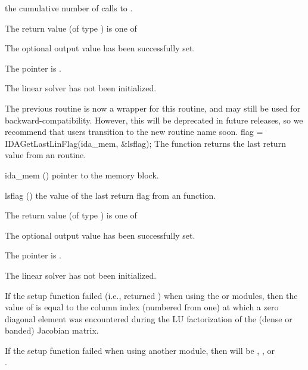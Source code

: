 {{\begin{args}[njvevals]
    the cumulative number of calls to .
  \end{args}
}
{
  The return value  (of type ) is one of
  \begin{args}
  \item[\Id{IDALS\_SUCCESS}]
    The optional output value has been successfully set.
  \item[\Id{IDALS\_MEM\_NULL}]
    The  pointer is .
  \item[\Id{IDALS\_LMEM\_NULL}]
    The {\idals} linear solver has not been initialized.
  \end{args}
}
{
  The previous routine  is now a wrapper for
  this routine, and may still be used for backward-compatibility.
  However, this will be deprecated in future releases, so we recommend
  that users transition to the new routine name soon.
}
{
  flag = IDAGetLastLinFlag(ida\_mem, \&lsflag);
}
{
  The function  returns the
  last return value from an {\idals} routine.
}
{
  \begin{args}
  \item[ida\_mem] ()
    pointer to the {\ida} memory block.
  \item[lsflag] ()
    the value of the last return flag from an {\idals} function.
  \end{args}
}
{
  The return value  (of type ) is one of
  \begin{args}
  \item[\Id{IDALS\_SUCCESS}]
    The optional output value has been successfully set.
  \item[\Id{IDALS\_MEM\_NULL}]
    The  pointer is .
  \item[\Id{IDALS\_LMEM\_NULL}]
    The {\idals} linear solver has not been initialized.
  \end{args}
}
{
  If the {\idals} setup function failed (i.e.,  returned
  ) when using the {\sunlinsoldense} or
  {\sunlinsolband} modules, then the value of  is equal to
  the column index (numbered from one) at which a zero diagonal
  element was encountered during the LU factorization of the (dense or
  banded) Jacobian matrix.

  If the {\idals} setup function failed when using another
  {\sunlinsol} module, then  will be
  , , or
  \\ \noindent {}.

}}
